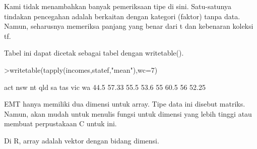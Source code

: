 \documentclass[12pt,arial,letterpaper]{book}
\begin{document}
\begin{eulercomment}
\begin{eulercomment}
\begin{eulercomment}
\begin{eulercomment}
\begin{eulercomment}
\begin{eulercomment}
\begin{eulercomment}
\begin{eulercomment}
\begin{eulercomment}
\begin{eulercomment}
\begin{eulercomment}
\begin{eulercomment}
\begin{eulercomment}
\begin{eulercomment}
\begin{eulercomment}
\begin{eulercomment}
\begin{eulercomment}
\begin{eulercomment}
\begin{eulercomment}
\begin{eulercomment}
\begin{eulercomment}
\begin{eulercomment}
\begin{eulercomment}
\begin{eulercomment}
\begin{eulercomment}
\begin{eulercomment}
\begin{eulercomment}
\begin{eulercomment}
\begin{eulercomment}
\begin{eulercomment}
\begin{eulercomment}
\begin{eulercomment}
\begin{eulercomment}
\begin{eulercomment}
\begin{eulercomment}
\begin{eulercomment}
\begin{eulercomment}
Kami tidak menambahkan banyak pemeriksaan tipe di sini. Satu-satunya
tindakan pencegahan adalah berkaitan dengan kategori (faktor) tanpa
data. Namun, seharusnya memeriksa panjang yang benar dari t dan
kebenaran koleksi tf.

Tabel ini dapat dicetak sebagai tabel dengan writetable().
\end{eulercomment}
\begin{eulerprompt}
>writetable(tapply(incomes,statef,"mean"),wc=7)
\end{eulerprompt}
\begin{euleroutput}
      act    nsw     nt    qld     sa    tas    vic     wa
     44.5  57.33   55.5   53.6     55   60.5     56  52.25
\end{euleroutput}
\begin{eulercomment}
EMT hanya memiliki dua dimensi untuk array. Tipe data ini disebut
matriks. Namun, akan mudah untuk menulis fungsi untuk dimensi yang
lebih tinggi atau membuat perpustakaan C untuk ini.

Di R, array adalah vektor dengan bidang dimensi.


\end{eulercomment}
\end{eulercomment}
\end{eulercomment}
\end{eulercomment}
\end{eulercomment}
\end{eulercomment}
\end{eulercomment}
\end{eulercomment}
\end{eulercomment}
\end{eulercomment}
\end{eulercomment}
\end{eulercomment}
\end{eulercomment}
\end{eulercomment}
\end{eulercomment}
\end{eulercomment}
\end{eulercomment}
\end{eulercomment}
\end{eulercomment}
\end{eulercomment}
\end{eulercomment}
\end{eulercomment}
\end{eulercomment}
\end{eulercomment}
\end{eulercomment}
\end{eulercomment}
\end{eulercomment}
\end{eulercomment}
\end{eulercomment}
\end{eulercomment}
\end{eulercomment}
\end{eulercomment}
\end{eulercomment}
\end{eulercomment}
\end{eulercomment}
\end{eulercomment}
\end{eulercomment}
\end{document}
